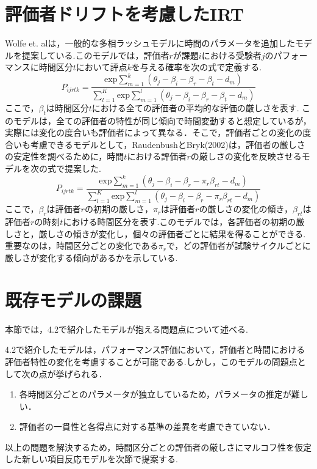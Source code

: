 \documentclass[a4paper,11pt,oneside,openany]{jsbook}
\begin{document}
\section{評価者ドリフトを考慮したIRT}

Wolfe et. al\cite{Wolfe}は，一般的な多相ラッシュモデルに時間のパラメータを追加したモデルを提案している.このモデルでは，評価者$r$が課題$i$における受験者$j$のパフォーマンスに時間区分$t$において評点$k$を与える確率を次の式で定義する.
\begin{displaymath}
P_{ijrtk}=\frac{\mathrm{exp}\sum_{m=1}^{k}(\theta_{j}-\beta_{i}-\beta_{r}-\beta_{t}-d_{m})}{\sum_{l=1}^{K}\mathrm{exp}\sum_{m=1}^{l}(\theta_{j}-\beta_{i}-\beta_{r}-\beta_{t}-d_{m})}
\end{displaymath}
ここで，$\beta_t$は時間区分$t$における全ての評価者の平均的な評価の厳しさを表す.
このモデルは，全ての評価者の特性が同じ傾向で時間変動すると想定しているが，実際には変化の度合いも評価者によって異なる．そこで，評価者ごとの変化の度合いも考慮できるモデルとして，RaudenbushとBryk(2002)\cite{Raudenbush}は，評価者の厳しさの安定性を調べるために，時間$t$における評価者$r$の厳しさの変化を反映させるモデルを次の式で提案した.
\begin{displaymath}
P_{ijrtk}=\frac{\mathrm{exp}\sum_{m=1}^{k}(\theta_{j}-\beta_{i}-\beta_{r} - \pi_{r}\beta_{rt}-d_{m})}{\sum_{l=1}^{K}\mathrm{exp}\sum_{m=1}^{l}(\theta_{j}-\beta_{i}-\beta_{r} - \pi_{r}\beta_{rt}-d_{m})}
\end{displaymath}
ここで，$\beta_{r}$は評価者$r$の初期の厳しさ，$\pi_{r}$は評価者$r$の厳しさの変化の傾き，$\beta_{rt}$は評価者$r$の時刻$t$における時間区分を表す.このモデルでは，各評価者の初期の厳しさと，厳しさの傾きが変化し，個々の評価者ごとに結果を得ることができる.重要なのは，時間区分ごとの変化である$\pi_{r}$で，どの評価者が試験サイクルごとに厳しさが変化する傾向があるかを示している.

\section{既存モデルの課題}
本節では，4.2で紹介したモデルが抱える問題点について述べる.

4.2で紹介したモデルは，パフォーマンス評価において，評価者と時間における評価者特性の変化を考慮することが可能である.しかし，このモデルの問題点として次の点が挙げられる．
\begin{enumerate}
  \item 各時間区分ごとのパラメータが独立しているため，パラメータの推定が難しい．
  \item 評価者の一貫性と各得点に対する基準の差異を考慮できていない．
\end{enumerate}  
以上の問題を解決するため，時間区分ごとの評価者の厳しさにマルコフ性を仮定した新しい項目反応モデルを次節で提案する.
\newpage
\end{document}
